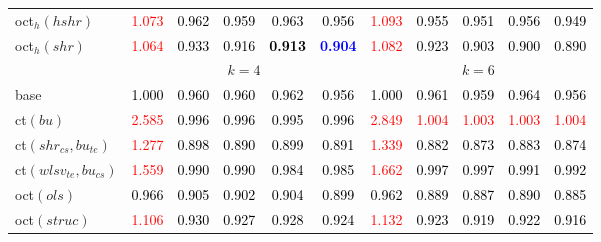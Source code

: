 \begin{tabular}[t]{l|>{}cccc>{}c|ccccc}
oct$_h(hshr)$ & \textcolor{red}{1.073} & \textcolor{black}{0.962} & \textcolor{black}{0.959} & \textcolor{black}{0.963} & \textcolor{black}{0.956} & \textcolor{red}{1.093} & \textcolor{black}{0.955} & \textcolor{black}{0.951} & \textcolor{black}{0.956} & \textcolor{black}{0.949}\\
oct$_h(shr)$ & \textcolor{red}{1.064} & \textcolor{black}{0.933} & \textcolor{black}{0.916} & \textcolor{black}{\textbf{0.913}} & \textcolor{blue}{\textbf{0.904}} & \textcolor{red}{1.082} & \textcolor{black}{0.923} & \textcolor{black}{0.903} & \textcolor{black}{0.900} & \textcolor{black}{0.890}\\
\addlinespace[0.3em]
\multicolumn{1}{c}{} & \multicolumn{5}{c}{\textbf{$k = 4$}} & \multicolumn{5}{c}{\textbf{$k = 6$}}\\
base & \textcolor{black}{1.000} & \textcolor{black}{0.960} & \textcolor{black}{0.960} & \textcolor{black}{0.962} & \textcolor{black}{0.956} & \textcolor{black}{1.000} & \textcolor{black}{0.961} & \textcolor{black}{0.959} & \textcolor{black}{0.964} & \textcolor{black}{0.956}\\
ct$(bu)$ & \textcolor{red}{2.585} & \textcolor{black}{0.996} & \textcolor{black}{0.996} & \textcolor{black}{0.995} & \textcolor{black}{0.996} & \textcolor{red}{2.849} & \textcolor{red}{1.004} & \textcolor{red}{1.003} & \textcolor{red}{1.003} & \textcolor{red}{1.004}\\
ct$(shr_{cs}, bu_{te})$ & \textcolor{red}{1.277} & \textcolor{black}{0.898} & \textcolor{black}{0.890} & \textcolor{black}{0.899} & \textcolor{black}{0.891} & \textcolor{red}{1.339} & \textcolor{black}{0.882} & \textcolor{black}{0.873} & \textcolor{black}{0.883} & \textcolor{black}{0.874}\\
ct$(wlsv_{te}, bu_{cs})$ & \textcolor{red}{1.559} & \textcolor{black}{0.990} & \textcolor{black}{0.990} & \textcolor{black}{0.984} & \textcolor{black}{0.985} & \textcolor{red}{1.662} & \textcolor{black}{0.997} & \textcolor{black}{0.997} & \textcolor{black}{0.991} & \textcolor{black}{0.992}\\
oct$(ols)$ & \textcolor{black}{0.966} & \textcolor{black}{0.905} & \textcolor{black}{0.902} & \textcolor{black}{0.904} & \textcolor{black}{0.899} & \textcolor{black}{0.962} & \textcolor{black}{0.889} & \textcolor{black}{0.887} & \textcolor{black}{0.890} & \textcolor{black}{0.885}\\
oct$(struc)$ & \textcolor{red}{1.106} & \textcolor{black}{0.930} & \textcolor{black}{0.927} & \textcolor{black}{0.928} & \textcolor{black}{0.924} & \textcolor{red}{1.132} & \textcolor{black}{0.923} & \textcolor{black}{0.919} & \textcolor{black}{0.922} & \textcolor{black}{0.916}\\

\end{tabular}
